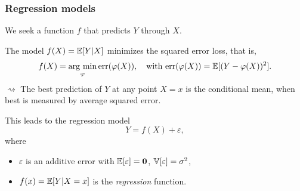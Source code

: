 \documentclass[10pt, c, xcolor=x11names]{beamer}\usepackage[]{graphicx}\usepackage[]{color}
\begin{document}
\begin{frame}
  \frametitle{Regression models}

  We seek a function $f$ that predicts $Y$ through $X$.

  \begin{proposition} The  model $f(X)=\mathbb{E}[Y|X]$ minimizes  the squared
    error loss, that is,
    \begin{equation*}
      f(X)   =    \mathop{\mathrm{arg\ min}}_{\varphi}   \mathrm{err}(\varphi(X)),   \quad
      \text{with } \mathrm{err}(\varphi(X)) = \mathbb{E}[(Y - \varphi(X))^2].
    \end{equation*}
    $\rightsquigarrow$ The best prediction of $Y$ at any point $X = x$
    is the conditional mean, when  best is measured by average squared
    error.
  \end{proposition}

  \vfill

  This leads to the regression model
    \begin{equation*}
      Y = f(X) + \varepsilon,
    \end{equation*}
    where
    \begin{itemize}
    \item     $\varepsilon$     is     an    additive     error     with
      $\mathbb{E}[\varepsilon]=\mathbf{0}$, $\mathbb{V}[\varepsilon]=\sigma^2$,
    \item $f(x) = \mathbb{E}[Y | X = x]$ is the \emph{regression} function.
    \end{itemize}

\end{frame}
\end{document}
